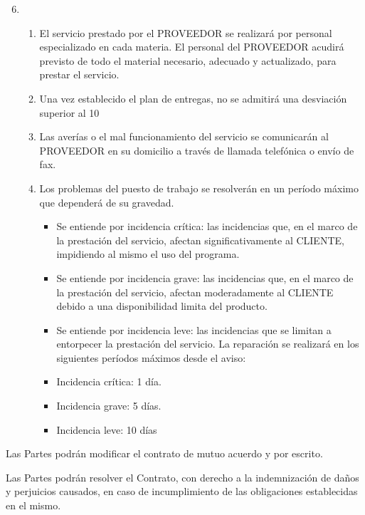 \begin{description}[style=nextline]
\item[SEXTA.- ACUERDO DE NIVEL DE SERVICIO]

\begin{enumerate}
  \setcounter{enumi}{5}
  \item
  \begin{enumerate}
    \item	El servicio prestado por el PROVEEDOR se realizará por personal especializado en cada materia. El personal del PROVEEDOR acudirá previsto de todo el material necesario, adecuado y actualizado, para prestar el servicio.
    \item	Una vez establecido el plan de entregas, no se admitirá una desviación superior al 10%
    \item	Las averías o el mal funcionamiento del servicio se comunicarán al PROVEEDOR en su domicilio a través de llamada telefónica o envío de fax.
    \item	Los problemas del puesto de trabajo se resolverán en un período máximo que dependerá de su gravedad.
    \begin{itemize}[-]
      \item	Se entiende por incidencia crítica: las incidencias que, en el marco de la prestación del servicio, afectan significativamente al CLIENTE, impidiendo al mismo el uso del programa.
      \item	Se entiende por incidencia grave: las incidencias que, en el marco de la prestación del servicio, afectan moderadamente al CLIENTE debido a una disponibilidad limita del producto.
      \item	Se entiende por incidencia leve: las incidencias que se limitan a entorpecer la prestación del servicio.
      La reparación se realizará en los siguientes períodos máximos  desde el aviso:
      \item	Incidencia crítica: 1 día.
      \item	Incidencia grave: 5 días.
      \item	Incidencia leve: 10 días
    \end{itemize}
  \end{enumerate}
\end{enumerate}

\item[SÉPTIMA.- MODIFICACIÓN]
\par Las Partes podrán modificar el contrato de mutuo acuerdo y por escrito.

\item[OCTAVA.- RESOLUCIÓN]
\par Las Partes podrán resolver el Contrato, con derecho a la indemnización de daños y perjuicios causados, en caso de incumplimiento de las obligaciones establecidas en el mismo.


\end{description}
